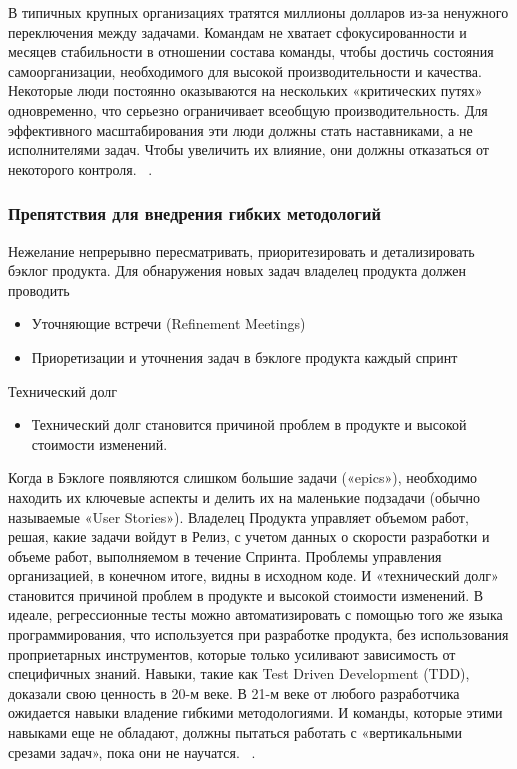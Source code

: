 \documentclass{../industrial-development}
\begin{document}
\lecturenotes
В типичных крупных организациях тратятся миллионы долларов из-за ненужного переключения между задачами. Командам не хватает сфокусированности и месяцев стабильности в отношении состава команды, чтобы достичь состояния самоорганизации, необходимого для высокой производительности и качества. Некоторые люди постоянно оказываются на нескольких «критических путях» одновременно, что серьезно ограничивает всеобщую производительность. Для эффективного масштабирования эти люди должны стать наставниками, а не исполнителями задач. Чтобы увеличить их влияние, они должны отказаться от некоторого контроля. 
~\cite{Fowler}.


\begin{frame} \frametitle{Препятствия для внедрения гибких методологий}
Нежелание непрерывно пересматривать, приоритезировать и детализировать бэклог продукта.\newline
Для обнаружения новых задач владелец продукта должен проводить
	\begin{itemize}
		\item Уточняющие встречи (Refinement Meetings) 
		\item Приоретизации и уточнения задач в бэклоге продукта каждый спринт
\end{itemize}
Технический долг
  \begin{itemize}
		\item Технический долг становится причиной проблем в продукте и высокой стоимости изменений. 
	\end{itemize}
\end{frame}

\lecturenotes
 Когда в Бэклоге появляются слишком большие задачи («epics»), необходимо находить их ключевые аспекты и делить их на маленькие подзадачи (обычно называемые «User Stories»). Владелец Продукта управляет объемом работ, решая, какие задачи войдут в Релиз, с учетом данных о скорости разработки и объеме работ, выполняемом в течение Спринта.  
Проблемы управления организацией, в конечном итоге, видны в исходном коде. И «технический долг» становится причиной проблем в продукте и высокой стоимости изменений. В идеале, регрессионные тесты можно автоматизировать с помощью того же языка программирования, что используется при разработке продукта, без использования проприетарных инструментов, которые только усиливают зависимость от специфичных знаний. Навыки, такие как Test Driven Development (TDD), доказали свою ценность в 20-м веке. В 21-м веке от любого разработчика ожидается навыки владение гибкими методологиями. И команды, которые этими навыками еще не обладают, должны пытаться работать с «вертикальными срезами задач», пока они не научатся.  
~\cite{Fowler}.
\end{document}
